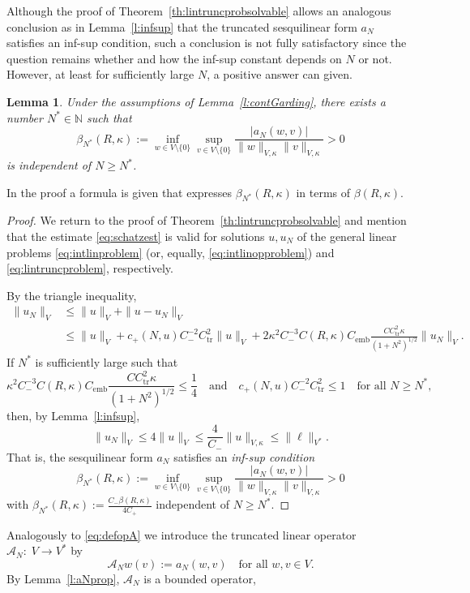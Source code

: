 \documentclass[12pt,DIV=14]{scrartcl}
\newtheorem{lemma}[definition]{Lemma}
\providecommand{\N}{\mathbb{N}}
\begin{document}
Although the proof of Theorem~\ref{th:lintruncprobsolvable} allows an analogous conclusion
as in Lemma~\ref{l:infsup} that the truncated sesquilinear form $a_N$ satisfies an inf-sup condition,
such a conclusion is not fully satisfactory since the question remains
whether and how the  inf-sup constant depends on $N$ or not.
However, at least for sufficiently large $N$, a positive answer can given.
\begin{lemma}\label{l:truncinfsup}
Under the assumptions of Lemma~\ref{l:contGarding},
there exists a number $N^\ast\in\N$ such that
\[
\beta_{N^\ast}(R,\kappa) := \inf_{w\in V\setminus\{0\}}\sup_{v\in V\setminus\{0\}}
\frac{|a_N(w,v)|}{\|w\|_{V,\kappa} \|v\|_{V,\kappa}}>0
\]
is independent of $N\ge N^\ast$.
\end{lemma}
In the proof a formula is given that expresses $\beta_{N^\ast}(R,\kappa)$
in terms of $\beta(R,\kappa)$.
\begin{proof}
We return to the proof of Theorem~\ref{th:lintruncprobsolvable} and
mention that the estimate \eqref{eq:schatzest} is valid for
solutions $u,u_N$ of the general linear problems \eqref{eq:intlinproblem}
(or, equally, \eqref{eq:intlinopproblem}) and \eqref{eq:lintruncproblem}, respectively.

By the triangle inequality,
\begin{align*}
\|u_N\|_V &\le \|u\|_V + \|u-u_N\|_V \\
&\le \|u\|_V + c_+(N,u) C_-^{-2}C_\mathrm{tr}^2 \|u\|_V + 2\kappa^2 C_-^{-3}C(R,\kappa) C_\mathrm{emb}
\frac{CC_\mathrm{tr}^2\kappa}{(1+N^2)^{1/2}} \|u_N\|_V.
\end{align*}
If $N^\ast$ is sufficiently large such that
\[
\kappa^2 C_-^{-3}C(R,\kappa) C_\mathrm{emb}
\frac{CC_\mathrm{tr}^2\kappa}{(1+N^2)^{1/2}} \le \frac14
\quad\text{and}\quad
c_+(N,u) C_-^{-2}C_\mathrm{tr}^2 \le 1
\quad\text{for all }N\ge N^\ast,
\]
then, by Lemma~\ref{l:infsup},
\[
\|u_N\|_V \le 4 \|u\|_V \le \frac{4}{C_-} \|u\|_{V,\kappa}
\le  \|\ell\|_{V^\ast}.
\]
That is, the sesquilinear form $a_N$ satisfies an \emph{inf-sup condition}
\[
\beta_{N^\ast}(R,\kappa) := \inf_{w\in V\setminus\{0\}}\sup_{v\in V\setminus\{0\}}
\frac{|a_N(w,v)|}{\|w\|_{V,\kappa} \|v\|_{V,\kappa}} > 0
\]
with $\displaystyle\beta_{N^\ast}(R,\kappa):= \frac{C_- \beta(R,\kappa)}{4C_+}$
independent of $N\ge N^\ast$.
\end{proof}
Analogously to \eqref{eq:defopA} we introduce the truncated linear operator
$\mathcal{A}_N:\; V \to V^\ast$ by
\[
\mathcal{A}_N w(v) := a_N(w,v)
\quad\text{for all } w,v\in V.
\]
By Lemma~\ref{l:aNprop}, $\mathcal{A}_N$ is a bounded operator,
\end{document}
